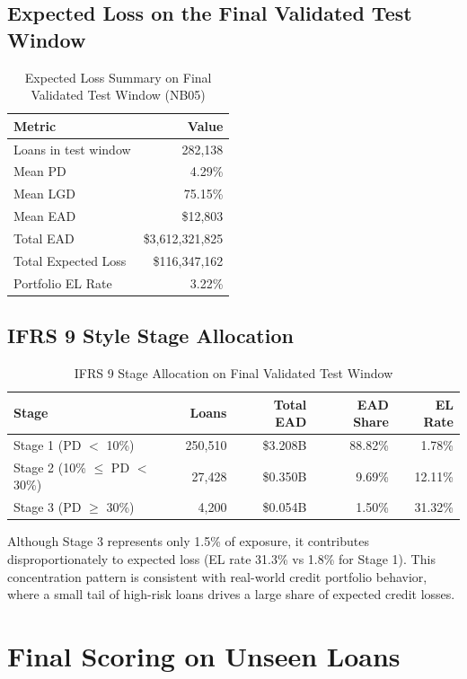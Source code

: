 \documentclass[12pt]{article}
\begin{document}
\subsection{Expected Loss on the Final Validated Test Window}

\begin{table}[H]
\centering
\caption{Expected Loss Summary on Final Validated Test Window (NB05)}
\begin{tabular}{lr}
\toprule
Metric & Value \\
\midrule
Loans in test window & 282,138 \\
Mean PD & 4.29\% \\
Mean LGD & 75.15\% \\
Mean EAD & \$12,803 \\
Total EAD & \$3,612,321,825 \\
Total Expected Loss & \$116,347,162 \\
Portfolio EL Rate & 3.22\% \\
\bottomrule
\end{tabular}
\end{table}

\subsection{IFRS 9 Style Stage Allocation}

\begin{table}[H]
\centering
\caption{IFRS 9 Stage Allocation on Final Validated Test Window}
\begin{tabular}{lrrrr}
\toprule
Stage & Loans & Total EAD & EAD Share & EL Rate \\
\midrule
Stage 1 (PD $<$ 10\%) & 250,510 & \$3.208B & 88.82\% & 1.78\% \\
Stage 2 (10\% $\leq$ PD $<$ 30\%) & 27,428 & \$0.350B & 9.69\% & 12.11\% \\
Stage 3 (PD $\geq$ 30\%) & 4,200 & \$0.054B & 1.50\% & 31.32\% \\
\bottomrule
\end{tabular}
\end{table}

Although Stage 3 represents only 1.5\% of exposure, it contributes disproportionately to expected loss (EL rate 31.3\% vs 1.8\% for Stage 1). This concentration pattern is consistent with real-world credit portfolio behavior, where a small tail of high-risk loans drives a large share of expected credit losses.

\section{Final Scoring on Unseen Loans}
\end{document}
